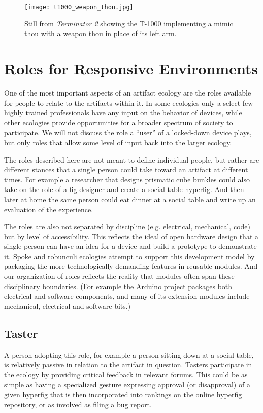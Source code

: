 \begin{figure}[]
  \centering
    \texttt{[image: t1000\_weapon\_thou.jpg]}
  \caption{Still from \emph{Terminator 2} showing the T-1000 implementing a mimic thou with a weapon thou in place of its left arm.}
  \label{fig:t1000_weapon_thou}
\end{figure}



\section{Roles for Responsive Environments}
\label{sec:roles}
%
One of the most important aspects of an artifact ecology are the roles available for people to relate to the artifacts within it. In some ecologies only a select few highly trained professionals have any input on the behavior of devices, while other ecologies provide opportunities for a broader spectrum of society to participate. We will not discuss the role a ``user'' of a locked{}-down device plays, but only roles that allow some level of input back into the larger ecology.

The roles described here are not meant to define individual people, but rather are different stances that a single person could take toward an artifact at different times. For example a researcher that designs prismatic cube bunkles could also take on the role of a fig designer and create a social table hyperfig. And then later at home the same person could eat dinner at a social table and write up an evaluation of the experience.

The roles are also not separated by discipline (e.g. electrical, mechanical, code) but by level of accessibility. This reflects the ideal of open hardware design that a single person can have an idea for a device and build a prototype to demonstrate it. Spoke and robunculi ecologies attempt to support this development model by packaging the more technologically demanding features in reusable modules. And our organization of roles reflects the reality that modules often span these disciplinary boundaries. (For example the Arduino project packages both electrical and software components, and many of its extension modules include mechanical, electrical and software bits.)

\subsection{Taster}
A person adopting this role, for example a person sitting down at a social table, is relatively passive in relation to the artifact in question. Tasters participate in the ecology by providing critical feedback in relevant forums. This could be as simple as having a specialized gesture expressing approval (or disapproval) of a given hyperfig that is then incorporated into rankings on the online hyperfig repository, or as involved as filing a bug report.

